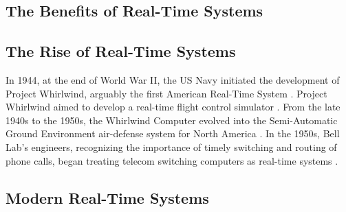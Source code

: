 \subsection{The Benefits of Real-Time Systems}



\subsection{The Rise of Real-Time Systems}


In 1944, at the end of World War II, the US Navy initiated the development of Project Whirlwind, arguably the first American Real-Time System \cite{laplante_historical_1995}.
Project Whirlwind aimed to develop a real-time flight control simulator \cite{forrester_whirlwind_1990}.
From the late 1940s to the 1950s, the Whirlwind Computer evolved into the Semi-Automatic Ground Environment air-defense system for North America \cite{noauthor_tales_nodate}.
In the 1950s, Bell Lab's engineers, recognizing the importance of timely switching and routing of phone calls, began treating telecom switching computers as real-time systems \cite{joel_communication_1957}.

\subsection{Modern Real-Time Systems}


